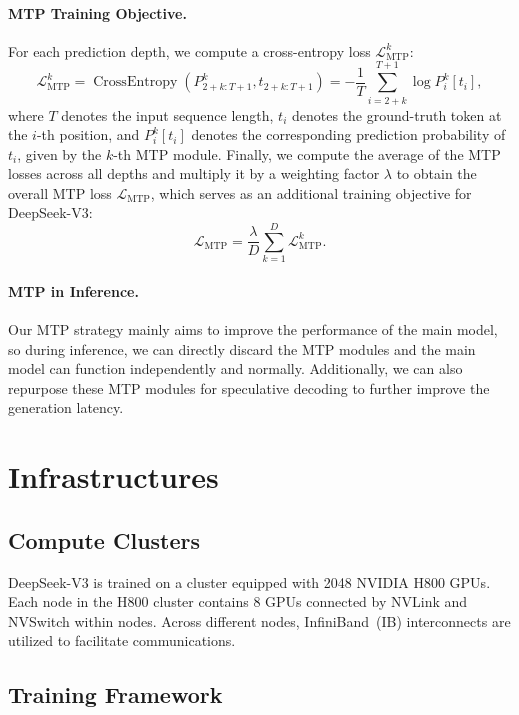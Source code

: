 \documentclass[11pt, a4paper, logo, copyright, nonumbering]{deepseek}
\newcommand{\dsviii}{DeepSeek-V3}
\begin{document}
\begin{CJK*}{UTF8}{gbsn}
\paragraph{MTP Training Objective.}
For each prediction depth, we compute a cross-entropy loss $\mathcal{L}_{\text{MTP}}^{k}$:
\begin{equation}
    \mathcal{L}_{\text{MTP}}^{k} = \operatorname{CrossEntropy}(P_{2 + k:T + 1}^{k}, t_{2 + k:T + 1}) = -\frac{1}{T} \sum_{i=2 + k}^{T + 1} \log P_i^k [t_i],
\end{equation}
where $T$ denotes the input sequence length, $t_i$ denotes the ground-truth token at the $i$-th position, and $P_i^k [t_i]$ denotes the corresponding prediction probability of $t_i$, given by the $k$-th MTP module. 
Finally, we compute the average of the MTP losses across all depths and multiply it by a weighting factor $\lambda$ to obtain the overall MTP loss $\mathcal{L}_{\text{MTP}}$, which serves as an additional training objective for \dsviii{}:
\begin{equation}
    \mathcal{L}_{\text{MTP}} = \frac{\lambda}{D} \sum_{k=1}^{D} \mathcal{L}_{\text{MTP}}^{k}.
\end{equation}

\paragraph{MTP in Inference.}
Our MTP strategy mainly aims to improve the performance of the main model, so during inference, we can directly discard the MTP modules and the main model can function independently and normally.
Additionally, we can also repurpose these MTP modules for speculative decoding to further improve the generation latency.

\section{Infrastructures}
\label{sec:infra}

\subsection{Compute Clusters}

\dsviii{} is trained on a cluster equipped with 2048 NVIDIA H800 GPUs. 
Each node in the H800 cluster contains 8 GPUs connected by NVLink and NVSwitch within nodes. 
Across different nodes, InfiniBand~(IB) interconnects are utilized to facilitate communications.

\subsection{Training Framework}


\end{CJK*}
\end{document}

